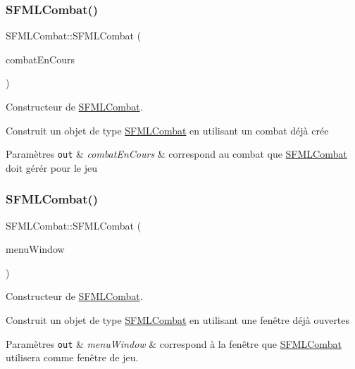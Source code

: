 \subsubsection{\texorpdfstring{S\+F\+M\+L\+Combat()}{SFMLCombat()}\hspace{0.1cm}{\footnotesize\ttfamily [2/3]}}
{\footnotesize\ttfamily S\+F\+M\+L\+Combat\+::\+S\+F\+M\+L\+Combat (\begin{DoxyParamCaption}\item[{\hyperlink{class_combat}{Combat} \&}]{combat\+En\+Cours }\end{DoxyParamCaption})}



Constructeur de \hyperlink{class_s_f_m_l_combat}{S\+F\+M\+L\+Combat}. 

Construit un objet de type \hyperlink{class_s_f_m_l_combat}{S\+F\+M\+L\+Combat} en utilisant un combat déjà crée 
\begin{DoxyParams}[1]{Paramètres}
\mbox{\tt out}  & {\em combat\+En\+Cours} & correspond au combat que \hyperlink{class_s_f_m_l_combat}{S\+F\+M\+L\+Combat} doit gérér pour le jeu \\
\hline
\end{DoxyParams}
\mbox{\label{class_s_f_m_l_combat_a28a895c7f9efdbe12cb47e3495500346}} 
\subsubsection{\texorpdfstring{S\+F\+M\+L\+Combat()}{SFMLCombat()}\hspace{0.1cm}{\footnotesize\ttfamily [3/3]}}
{\footnotesize\ttfamily S\+F\+M\+L\+Combat\+::\+S\+F\+M\+L\+Combat (\begin{DoxyParamCaption}\item[{sf\+::\+Render\+Window \&}]{menu\+Window }\end{DoxyParamCaption})}



Constructeur de \hyperlink{class_s_f_m_l_combat}{S\+F\+M\+L\+Combat}. 

Construit un objet de type \hyperlink{class_s_f_m_l_combat}{S\+F\+M\+L\+Combat} en utilisant une fenêtre déjà ouvertes 
\begin{DoxyParams}[1]{Paramètres}
\mbox{\tt out}  & {\em menu\+Window} & correspond à la fenêtre que \hyperlink{class_s_f_m_l_combat}{S\+F\+M\+L\+Combat} utilisera comme fenêtre de jeu. \\
\hline
\end{DoxyParams}


